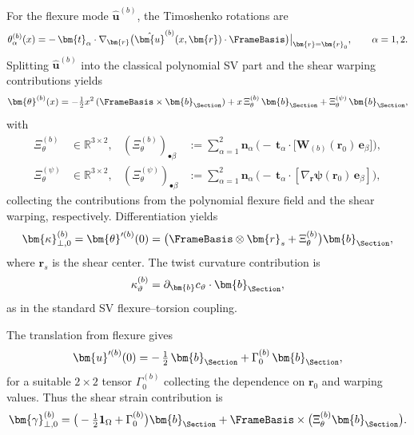 For the flexure mode $\hat{\bm{u}}^{(b)}$, the Timoshenko rotations are
\begin{equation}
\theta_\alpha^{(b)}(x)
=
-\,\bm{t}_\alpha\cdot\nabla_{\bm{r}}
\big(\hat{\bm{u}}^{(b)}(x,\bm{r})\cdot\FrameBasis\big)\big|_{\bm{r}=\bm{r}_0},
\qquad \alpha=1,2.
\end{equation}
Splitting $\hat{\bm{u}}^{(b)}$ into the classical polynomial SV part and the 
shear warping contributions yields
\begin{equation}
\bm{\theta}^{(b)}(x)
=
-\tfrac{1}{2}x^2\,(\FrameBasis\times\bm{b}_{\Section})
+ x\,\Xi^{(b)}_\theta\,\bm{b}_{\Section}
+ \Xi^{(\psi)}_\theta\,\bm{b}_{\Section},
\end{equation}
with
\begin{align}
\Xi^{(b)}_\theta &\in\mathbb{R}^{3\times 2},
&(\Xi^{(b)}_\theta)_{\bullet\beta} 
&:= \sum_{\alpha=1}^2 \bm{n}_\alpha\,
\Big(-\,\bm{t}_\alpha\cdot\big[\bm{W}_{(b)}(\bm{r}_0)\,\bm{e}_\beta\big]\Big),
\\[2pt]
\Xi^{(\psi)}_\theta &\in\mathbb{R}^{3\times 2},
&(\Xi^{(\psi)}_\theta)_{\bullet\beta}
&:= \sum_{\alpha=1}^2 \bm{n}_\alpha\,
\Big(-\,\bm{t}_\alpha\cdot[\nabla_{\bm{r}}\bm{\psi}(\bm{r}_0)\,\bm{e}_\beta]\Big),
\end{align}
collecting the contributions from the polynomial flexure field and the shear 
warping, respectively. Differentiation yields
\begin{equation}
\bm{\kappa}_{\perp,0}^{(b)}
=
\bm{\theta}'^{(b)}(0)
=
\big(\FrameBasis\otimes\bm{r}_s + \Xi^{(b)}_\theta\big)\bm{b}_{\Section},
\end{equation}
where $\bm{r}_s$ is the shear center. The twist curvature contribution is
\begin{equation}
\kappa_\vartheta^{(b)}
=
\partial_{\bm{b}}c_\vartheta\cdot\bm{b}_{\Section},
\end{equation}
as in the standard SV flexure–torsion coupling.

The translation from flexure gives
\begin{equation}
\bm{u}'^{(b)}(0)
=
-\,\tfrac{1}{2}\,\bm{b}_{\Section}
+ \Gamma^{(b)}_0\,\bm{b}_{\Section},
\end{equation}
for a suitable $2\times 2$ tensor $\Gamma^{(b)}_0$ collecting the dependence 
on $\bm{r}_0$ and warping values. Thus the shear strain contribution is
\begin{equation}
\bm{\gamma}_{\perp,0}^{(b)}
=
\big(-\tfrac{1}{2}\mathbf{1}_\Omega + \Gamma^{(b)}_0\big)\bm{b}_{\Section}
+ \FrameBasis\times\big(\Xi^{(b)}_\theta\bm{b}_{\Section}\big).
\end{equation}

